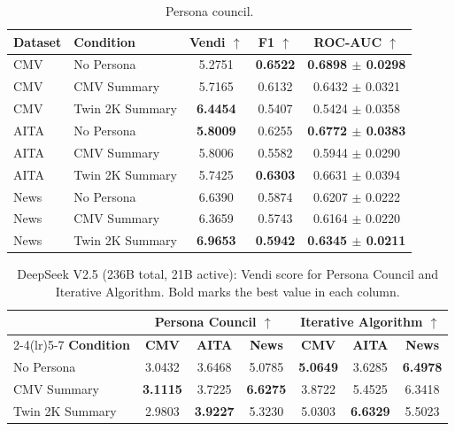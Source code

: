 \begin{table}[H]
\centering
\caption{Persona council.}
\label{tab:persona-council}
\small
\begin{tabular}{llccc}
\toprule
\textbf{Dataset} & \textbf{Condition} & \textbf{Vendi} $\uparrow$ & \textbf{F1} $\uparrow$ & \textbf{ROC-AUC} $\uparrow$ \\
\midrule
CMV & No Persona & 5.2751 & \textbf{0.6522} & \textbf{0.6898 $\pm$ 0.0298} \\
CMV & CMV Summary & 5.7165 & 0.6132 & 0.6432 $\pm$ 0.0321 \\
CMV & Twin 2K Summary & \textbf{6.4454} & 0.5407 & 0.5424 $\pm$ 0.0358 \\
\midrule
AITA & No Persona & \textbf{5.8009} & 0.6255 & \textbf{0.6772 $\pm$ 0.0383} \\
AITA & CMV Summary & 5.8006 & 0.5582 & 0.5944 $\pm$ 0.0290 \\
AITA & Twin 2K Summary & 5.7425 & \textbf{0.6303} & 0.6631 $\pm$ 0.0394 \\
\midrule
News & No Persona & 6.6390 & 0.5874 & 0.6207 $\pm$ 0.0222 \\
News & CMV Summary & 6.3659 & 0.5743 & 0.6164 $\pm$ 0.0220 \\
News & Twin 2K Summary & \textbf{6.9653} & \textbf{0.5942} & \textbf{0.6345 $\pm$ 0.0211} \\
\bottomrule
\end{tabular}
\end{table}

\begin{table}[H]
\centering
\caption{DeepSeek V2.5 (236B total, 21B active): Vendi score for Persona Council and Iterative Algorithm. Bold marks the best value in each column.}
\label{tab:model-deepseek-v25}
\small
\begin{tabular}{l|ccc|ccc}
\toprule
& \multicolumn{3}{c|}{\textbf{Persona Council} $\uparrow$} & \multicolumn{3}{c}{\textbf{Iterative Algorithm} $\uparrow$} \\
\cmidrule(lr){2-4}\cmidrule(lr){5-7}
\textbf{Condition} & \textbf{CMV} & \textbf{AITA} & \textbf{News} & \textbf{CMV} & \textbf{AITA} & \textbf{News} \\
\midrule
No Persona & 3.0432 & 3.6468 & 5.0785 & \textbf{5.0649} & 3.6285 & \textbf{6.4978} \\
CMV Summary & \textbf{3.1115} & 3.7225 & \textbf{6.6275} & 3.8722 & 5.4525 & 6.3418 \\
Twin 2K Summary & 2.9803 & \textbf{3.9227} & 5.3230 & 5.0303 & \textbf{6.6329} & 5.5023 \\
\bottomrule
\end{tabular}
\end{table}

